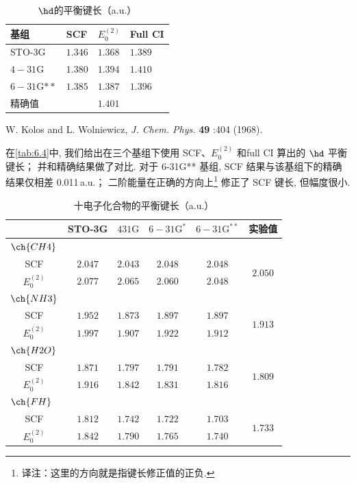 \begin{table}[H]
	\centering
	\caption{$\hd$的平衡键长（a.u.）}
	\begin{threeparttable}
		\begin{tabular}{llll}
			\hline 基组 & SCF & $E_0^{(2)}$ & Full CI \\
			\hline STO-3G & $1.346$ & $1.368$ & $1.389$ \\
			$4-31 \mathrm{G}$ & $1.380$ & $1.394$ & $1.410$ \\
			$6-31 \mathrm{G}{**}$ & $1.385$ & $1.387$ & $1.396$ \\
			\hline 精确值\tnote{a} & & $1.401$ & \\
			\hline
		\end{tabular}
		\begin{tablenotes}
			\item[a] W. Kolos and L. Wolniewicz, \textit{J. Chem. Phys.} \textbf{49} :404 (1968).
		\end{tablenotes}
	\end{threeparttable}
\label{tab:6.4}
\end{table}
在\autoref{tab:6.4}中, 
我们给出在三个基组下使用 SCF、$E_0^{(2)}$ 和full CI 算出的 $\hd$ 平衡键长；
并和精确结果做了对比.  
对于 6-31G** 基组, 
SCF 结果与该基组下的精确结果仅相差 0.011\,a.u.；
二阶能量在正确的方向上\footnote{译注：这里的方向就是指键长修正值的正负. }
修正了 SCF 键长, 但幅度很小. 

\begin{table}
	\centering
	\caption{十电子化合物的平衡键长（a.u.）}
	\begin{tabular}{lccccc}
		\hline & STO-3G & $431 \mathrm{G}$ & $6-31 \mathrm{G}^*$ & $6-31 \mathrm{G}^{* *}$ & 实验值 \\
		\hline
		$\ch{CH4}$ & & & & & \\
		\multicolumn{1}{c}{\quad SCF} & $2.047$ & $2.043$ & $2.048$ & $2.048$ & \multirow{2}{*}{$2.050$}\\
                \multicolumn{1}{c}{\quad $E_0^{(2)}$} & $2.077$ & $2.065$ & $2.060$ & $2.048$ & \\
		$\ch{NH3}$ & & & & & \\
                \multicolumn{1}{c}{\quad SCF} & $1.952$ & $1.873$ & $1.897$ & $1.897$ & \multirow{2}{*}{$1.913$}\\
                \multicolumn{1}{c}{\quad $E_0^{(2)}$} & $1.997$ & $1.907$ & $1.922$ & $1.912$ &  \\
		$\ch{H2O}$ & & & & & \\
                \multicolumn{1}{c}{\quad SCF} & $1.871$ & $1.797$ & $1.791$ & $1.782$ & \multirow{2}{*}{$1.809$}\\
                \multicolumn{1}{c}{\quad $E_0^{(2)}$} & $1.916$ & $1.842$ &  $1.831$ & $1.816$ & \\
		$\ch{FH}$ & & & & & \\ 
                \multicolumn{1}{c}{\quad SCF} & $1.812$ & $1.742$ & $1.722$ & $1.703$ & \multirow{2}{*}{$1.733$}\\
                \multicolumn{1}{c}{\quad $E_0^{(2)}$} & $1.842$ & $1.790$ & $1.765$ & $1.740$ & \\ \hline
	\end{tabular}
	\label{tab:6.5}
\end{table}

